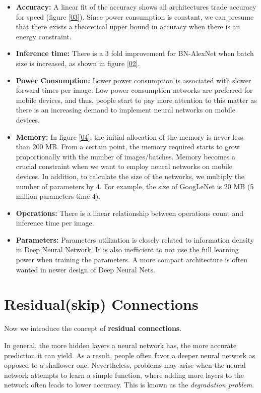 \begin{itemize}
    \item \textbf{Accuracy:} A linear fit of the accuracy shows all architectures trade accuracy for speed (figure \ref{03}). Since power consumption is constant, we can presume that there exists a theoretical upper bound in accuracy when there is an energy constraint.
    \item \textbf{Inference time:} There is a 3 fold improvement for BN-AlexNet when batch size is increased, as shown in figure \ref{02}. 
    \item \textbf{Power Consumption:} Lower power consumption is associated with slower forward times per image. Low power consumption networks are preferred for mobile devices, and thus, people start to pay more attention to this matter as there is an increasing demand to implement neural networks on mobile devices.
    \item \textbf{Memory:} In figure \ref{04}, the initial allocation of the memory is never less than 200 MB. From a certain point, the memory required starts to grow proportionally with the number of images/batches. Memory becomes a crucial constraint when we want to employ neural networks on mobile devices. In addition, to calculate the size of the networks, we multiply the number of parameters by 4. For example, the size of GoogLeNet is 20 MB (5 million parameters time 4).
    \item \textbf{Operations:} There is a linear relationship between operations count and inference time per image.
    \item \textbf{Parameters:} Parameters utilization is closely related to information density in Deep Neural Network. It is also inefficient to not use the full learning power when training the parameters. A more compact architecture is often wanted in newer design of Deep Neural Nets. 
\end{itemize}
\section{Residual(skip) Connections}

Now we introduce the concept of \textbf{residual connections}.

In general, the more hidden layers a neural network has, the more accurate prediction it can yield. As a result, people often favor a deeper neural network as opposed to a shallower one. Nevertheless, problems may arise when the neural network attempts to learn a simple function, where adding more layers to the network often leads to lower accuracy. This is known as the \textit{degradation problem}.

